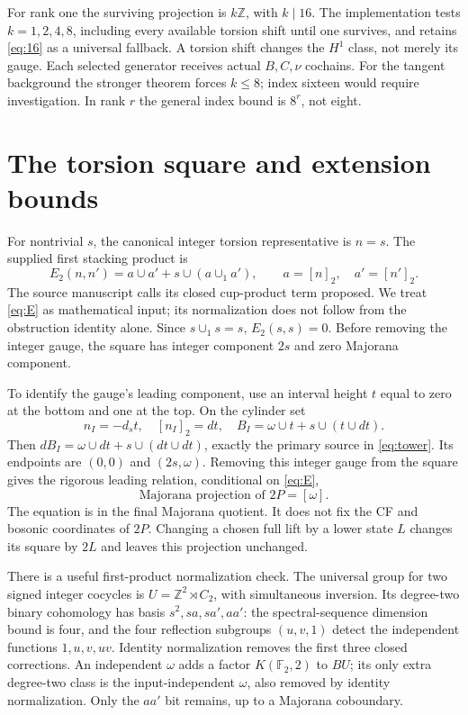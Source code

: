 \documentclass[11pt]{article}
\newcommand{\F}{\mathbb F_2}
\newcommand{\Z}{\mathbb Z}
\newcommand{\ds}{d_s}
\begin{document}
For rank one the surviving projection is $k\Z$, with $k\mid16$.
The implementation tests $k=1,2,4,8$, including every available torsion
shift until one survives, and retains \eqref{eq:16} as a universal
fallback. A torsion shift changes the $H^1$ class, not merely its gauge.
Each selected generator receives actual $B,C,\nu$ cochains. For the
tangent background the stronger theorem forces $k\leq8$; index sixteen
would require investigation. In rank $r$ the general index bound is
$8^r$, not eight.

\newpage
\section{The torsion square and extension bounds}
For nontrivial $s$, the canonical integer torsion representative is
$n=s$. The supplied first stacking product is
\begin{equation}\label{eq:E}
 E_2(n,n')=a\cup a'+s\cup(a\cup_1a'),\qquad
 a=[n]_2,\quad a'=[n']_2.
\end{equation}
The source manuscript calls its closed cup-product term proposed.
We treat \eqref{eq:E} as mathematical input; its normalization does
not follow from the obstruction identity alone. Since
$s\cup_1s=s$, $E_2(s,s)=0$. Before removing the integer gauge, the
square has integer component $2s$ and zero Majorana component.

To identify the gauge's leading component, use an interval height
$t$ equal to zero at the bottom and one at the top. On the cylinder set
\begin{equation}
 n_I=-\ds t,\quad [n_I]_2=dt,\quad
 B_I=\omega\cup t+s\cup(t\cup dt).
\end{equation}
Then $dB_I=\omega\cup dt+s\cup(dt\cup dt)$, exactly the primary
source in \eqref{eq:tower}. Its endpoints are $(0,0)$ and $(2s,\omega)$.
Removing this integer gauge from the square gives the rigorous leading
relation, conditional on \eqref{eq:E},
\begin{equation}\label{eq:leading}
 \text{Majorana projection of }2P=[\omega].
\end{equation}
The equation is in the final Majorana quotient. It does not fix the
CF and bosonic coordinates of $2P$. Changing a chosen full lift by a
lower state $L$ changes its square by $2L$ and leaves this projection
unchanged.

There is a useful first-product normalization check. The universal group
for two signed integer cocycles is
$U=\Z^2\rtimes C_2$, with simultaneous inversion. Its degree-two
binary cohomology has basis
$s^2,sa,sa',aa'$: the spectral-sequence dimension bound is four,
and the four reflection subgroups $(u,v,1)$ detect the independent
functions $1,u,v,uv$. Identity normalization removes the first three
closed corrections. An independent $\omega$ adds a factor
$K(\F,2)$ to $BU$; its only extra degree-two class is the
input-independent $\omega$, also removed by identity normalization.
Only the $aa'$ bit remains, up to a Majorana coboundary.
\end{document}
